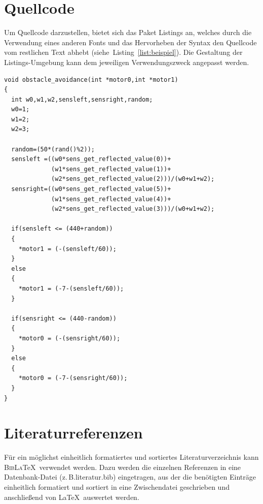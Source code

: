 \section{Quellcode}
Um Quellcode darzustellen, bietet sich das Paket Listings an, 
welches durch die Verwendung eines anderen Fonts und das Hervorheben 
der Syntax den Quellcode vom restlichen Text abhebt 
(siehe~Listing~\ref{list:beispiel}). 
Die Gestaltung der Listings-Umgebung kann dem jeweiligen 
Verwendungszweck angepasst werden.
\lstset{language=C, basicstyle=\footnotesize}
\begin{lstlisting}[float=!ht, frame=tb, captionpos=b, caption={Beispiel zum Hindernisvermeiden.}, label={list:beispiel}]
void obstacle_avoidance(int *motor0,int *motor1)
{
  int w0,w1,w2,sensleft,sensright,random;
  w0=1; 
  w1=2;
  w2=3;

  random=(50*(rand()%2));
  sensleft =((w0*sens_get_reflected_value(0))+
             (w1*sens_get_reflected_value(1))+
             (w2*sens_get_reflected_value(2)))/(w0+w1+w2);
  sensright=((w0*sens_get_reflected_value(5))+
             (w1*sens_get_reflected_value(4))+
             (w2*sens_get_reflected_value(3)))/(w0+w1+w2);

  if(sensleft <= (440+random))
  {
    *motor1 = (-(sensleft/60));
  }
  else
  {
    *motor1 = (-7-(sensleft/60));
  }
  
  if(sensright <= (440-random))
  {
    *motor0 = (-(sensright/60));
  }
  else
  {
    *motor0 = (-7-(sensright/60));
  }
} 
\end{lstlisting}


\section{Literaturreferenzen}
Für ein möglichst einheitlich formatiertes und sortiertes Literaturverzeichnis kann \textsc{BibLa}\TeX\ verwendet werden. Dazu werden die einzelnen Referenzen in eine Datenbank-Datei (z.\,B.\@ literatur.bib) eingetragen, aus der die benötigten Einträge einheitlich formatiert und sortiert in eine
Zwischendatei geschrieben und anschließend von \LaTeX\ auswertet werden. 
